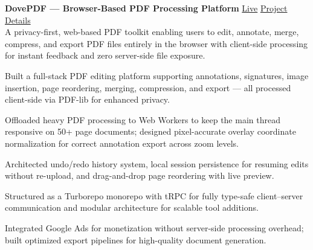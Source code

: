 \textbf{DovePDF --- Browser-Based PDF Processing Platform}
\hfill
\href{https://ahasnat.dev/projects/dove-pdf}{Live} \textbar{} \href{https://ahasnat.dev/projects/dove-pdf}{Project Details} \\
A privacy-first, web-based PDF toolkit enabling users to edit, annotate, merge, compress, and export PDF files entirely in the browser with client-side processing for instant feedback and zero server-side file exposure.
\begin{zitemize}
    \item Built a full-stack PDF editing platform supporting annotations, signatures, image insertion, page reordering, merging, compression, and export --- all processed client-side via PDF-lib for enhanced privacy.
    \item Offloaded heavy PDF processing to Web Workers to keep the main thread responsive on 50+ page documents; designed pixel-accurate overlay coordinate normalization for correct annotation export across zoom levels.
    \item Architected undo/redo history system, local session persistence for resuming edits without re-upload, and drag-and-drop page reordering with live preview.
    \item Structured as a Turborepo monorepo with tRPC for fully type-safe client--server communication and modular architecture for scalable tool additions.
    \item Integrated Google Ads for monetization without server-side processing overhead; built optimized export pipelines for high-quality document generation.
\end{zitemize}


